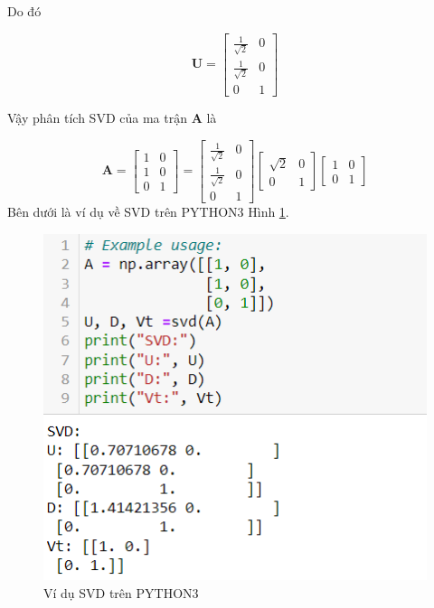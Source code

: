 \documentclass[12pt,a4paper,oneside]{report}
\numberwithin{equation}{section}
\begin{document}
Do đó

$$
\mathbf{U}=\left[\begin{array}{cc}
	\frac{1}{\sqrt{2}} & 0 \\
	\frac{1}{\sqrt{2}} & 0 \\
	0 & 1
\end{array}\right]
$$

Vậy phân tích SVD của ma trận $\mathbf{A}$ là

$$
\mathbf{A}=\left[\begin{array}{ll}
	1 & 0 \\
	1 & 0 \\
	0 & 1
\end{array}\right]=\left[\begin{array}{cc}
	\frac{1}{\sqrt{2}} & 0 \\
	\frac{1}{\sqrt{2}} & 0 \\
	0 & 1
\end{array}\right]\left[\begin{array}{cc}
	\sqrt{2} & 0 \\
	0 & 1
\end{array}\right]\left[\begin{array}{ll}
	1 & 0 \\
	0 & 1
\end{array}\right]
$$
Bên dưới là ví dụ về SVD trên PYTHON3 Hình \ref{fig:SVD_example}.
\newpage
\begin{figure}[htp]
	\centering
	\includegraphics[scale=0.9]{example_svd.png}
	\caption{Ví dụ SVD trên PYTHON3}
	\label{fig:SVD_example}
\end{figure}
\end{document}
